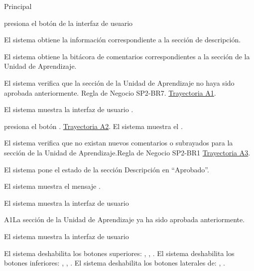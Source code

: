 \begin{UCtrayectoria}{Principal}

    \UCpaso[\UCactor] presiona el botón   de la interfaz de usuario 

    \UCpaso El sistema obtiene la información correspondiente a la sección de descripción.
    
    \UCpaso El sistema obtiene la bitácora de comentarios correspondientes a la sección de la Unidad de Aprendizaje. 
    
    \UCpaso El sistema verifica que la sección de la Unidad de Aprendizaje no haya sido aprobada anteriormente. Regla de Negocio SP2-BR7. \hyperlink{SP2-CU7-A1}{Trayectoria A1}. 
    
    \UCpaso El sistema muestra la interfaz de usuario  .
    
    \UCpaso[\UCactor] presiona el botón . \hyperlink{SP2-CU7-A2}{Trayectoria A2}.
    \UCpaso El sistema muestra el .
    
    \UCpaso	El sistema verifica que no existan nuevos comentarios o subrayados para la sección de la Unidad de Aprendizaje.Regla de Negocio  SP2-BR1 \hyperlink{SP2-CU7-A3}{Trayectoria A3}. 
    
    \UCpaso El sistema pone el estado de la sección Descripción  en “Aprobado”.
    
    \UCpaso El sistema muestra el mensaje .

    \UCpaso El sistema muestra la interfaz de usuario 

\end{UCtrayectoria}


\begin{UCtrayectoriaA}{A1}{La sección de la Unidad de Aprendizaje ya ha sido aprobada anteriormente.}

	\hypertarget{SP2-CU7-A1}{\UCpaso El sistema muestra la interfaz de usuario }
    \UCpaso El sistema deshabilita los botones superiores: , , .
    \UCpaso El sistema deshabilita los botones inferiores: , , .
    \UCpaso El sistema deshabilita los botones laterales de: , .
\end{UCtrayectoriaA}

